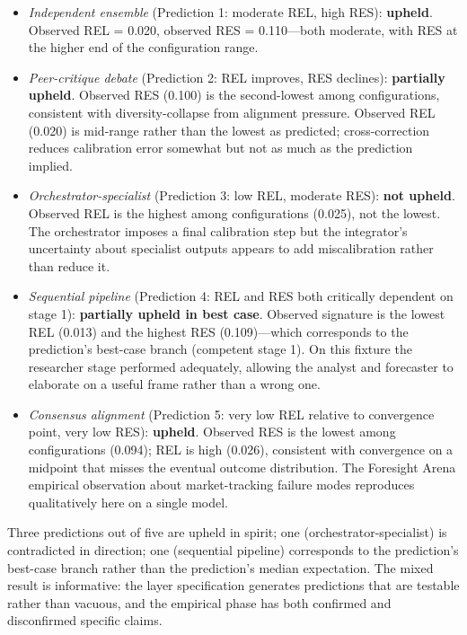 \documentclass[11pt]{article}
\begin{document}
\begin{itemize}
\item \emph{Independent ensemble} (Prediction 1: moderate REL, high RES): \textbf{upheld}. Observed REL = 0.020, observed RES = 0.110---both moderate, with RES at the higher end of the configuration range.
\item \emph{Peer-critique debate} (Prediction 2: REL improves, RES declines): \textbf{partially upheld}. Observed RES (0.100) is the second-lowest among configurations, consistent with diversity-collapse from alignment pressure. Observed REL (0.020) is mid-range rather than the lowest as predicted; cross-correction reduces calibration error somewhat but not as much as the prediction implied.
\item \emph{Orchestrator-specialist} (Prediction 3: low REL, moderate RES): \textbf{not upheld}. Observed REL is the highest among configurations (0.025), not the lowest. The orchestrator imposes a final calibration step but the integrator's uncertainty about specialist outputs appears to add miscalibration rather than reduce it.
\item \emph{Sequential pipeline} (Prediction 4: REL and RES both critically dependent on stage 1): \textbf{partially upheld in best case}. Observed signature is the lowest REL (0.013) and the highest RES (0.109)---which corresponds to the prediction's best-case branch (competent stage 1). On this fixture the researcher stage performed adequately, allowing the analyst and forecaster to elaborate on a useful frame rather than a wrong one.
\item \emph{Consensus alignment} (Prediction 5: very low REL relative to convergence point, very low RES): \textbf{upheld}. Observed RES is the lowest among configurations (0.094); REL is high (0.026), consistent with convergence on a midpoint that misses the eventual outcome distribution. The Foresight Arena empirical observation about market-tracking failure modes reproduces qualitatively here on a single model.
\end{itemize}

Three predictions out of five are upheld in spirit; one (orchestrator-specialist) is contradicted in direction; one (sequential pipeline) corresponds to the prediction's best-case branch rather than the prediction's median expectation. The mixed result is informative: the layer specification generates predictions that are testable rather than vacuous, and the empirical phase has both confirmed and disconfirmed specific claims.
\end{document}
